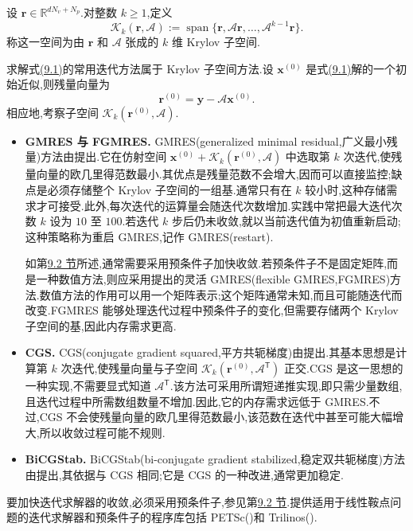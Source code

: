 \begin{note}
\label{note:chapter9-iterative-solvers}
\label{note:chapter9-multigrid-preconditioner}
设 $\bm r\in\mathbb{R}^{dN_v+N_p}$.对整数 $k\ge 1$,定义
\[
 \mathcal K_k(\bm r,\mathcal A)
 :=\operatorname{span}\{\bm r,\mathcal A\bm r,\ldots,
              \mathcal A^{k-1}\bm r\}.
\]
称这一空间为由 $\bm r$ 和 $\mathcal A$ 张成的 $k$ 维 Krylov 子空间.

求解式\hyperref[eq:chapter9-coupled-system]{(9.1)}的常用迭代方法属于 Krylov 子空间方法.设 $\bm{x}^{(0)}$ 是式\hyperref[eq:chapter9-coupled-system]{(9.1)}解的一个初始近似,则残量向量为
\[
 \bm r^{(0)}=\bm y-\mathcal A\bm x^{(0)}.
\]
相应地,考察子空间 $\mathcal K_k(\bm r^{(0)},\mathcal A)$.

\begin{itemize}
  \item \textbf{GMRES 与 FGMRES.} GMRES(generalized minimal residual,广义最小残量)方法由\textcite{SaadSchultz1986}提出.它在仿射空间 $\bm{x}^{(0)}+\mathcal K_k(\bm r^{(0)},\mathcal A)$ 中选取第 $k$ 次迭代,使残量向量的欧几里得范数最小.其优点是残量范数不会增大,因而可以直接监控;缺点是必须存储整个 Krylov 子空间的一组基.通常只有在 $k$ 较小时,这种存储需求才可接受.此外,每次迭代的运算量会随迭代次数增加.实践中常把最大迭代次数 $k$ 设为 $10$ 至 $100$.若迭代 $k$ 步后仍未收敛,就以当前迭代值为初值重新启动;这种策略称为重启 GMRES,记作 GMRES(restart).

  如第\hyperref[sec:chapter9-preconditioners]{9.2 节}所述,通常需要采用预条件子加快收敛.若预条件子不是固定矩阵,而是一种数值方法,则应采用\textcite{Saad1993}提出的灵活 GMRES(flexible GMRES,FGMRES)方法.数值方法的作用可以用一个矩阵表示;这个矩阵通常未知,而且可能随迭代而改变.FGMRES 能够处理迭代过程中预条件子的变化,但需要存储两个 Krylov 子空间的基,因此内存需求更高.

  \item \textbf{CGS.} CGS(conjugate gradient squared,平方共轭梯度)由\textcite{Sonneveld1989}提出.其基本思想是计算第 $k$ 次迭代,使残量向量与子空间 $\mathcal K_k(\bm r^{(0)},\mathcal A^{\mathsf T})$ 正交.CGS 是这一思想的一种实现,不需要显式知道 $\mathcal A^{\mathsf T}$.该方法可采用所谓短递推实现,即只需少量数组,且迭代过程中所需数组数量不增加.因此,它的内存需求远低于 GMRES.不过,CGS 不会使残量向量的欧几里得范数最小,该范数在迭代中甚至可能大幅增大,所以收敛过程可能不规则.

  \item \textbf{BiCGStab.} BiCGStab(bi-conjugate gradient stabilized,稳定双共轭梯度)方法由\textcite{VanDerVorst1992}提出,其依据与 CGS 相同;它是 CGS 的一种改进,通常更加稳定.
\end{itemize}

要加快迭代求解器的收敛,必须采用预条件子,参见第\hyperref[sec:chapter9-preconditioners]{9.2 节}.提供适用于线性鞍点问题的迭代求解器和预条件子的程序库包括 PETSc(\textcite{Balay2016})和 Trilinos(\textcite{Trilinos2016}).
\end{note}

